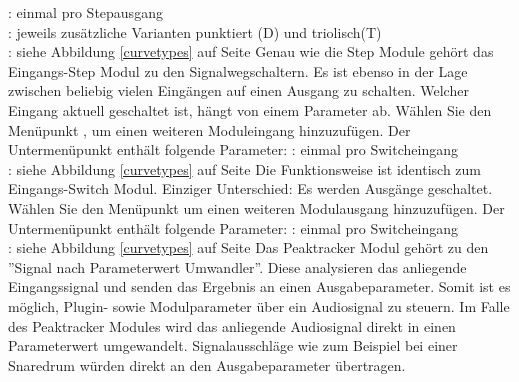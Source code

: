 	\eParameterlist
\stern : einmal pro Stepausgang \\ 
\sstern : jeweils zusätzliche Varianten punktiert (D) und triolisch(T) \\
\ssstern : siehe Abbildung \ref{curvetypes} auf Seite \pageref{curvetypes}
Genau wie die Step Module gehört das Eingangs-Step Modul zu den Signalwegschaltern. Es ist ebenso in der Lage zwischen beliebig vielen Eingängen auf einen Ausgang zu schalten. Welcher Eingang aktuell geschaltet ist, hängt von einem Parameter ab.
	Wählen Sie den Menüpunkt , um einen weiteren Moduleingang hinzuzufügen.
	Der Untermenüpunkt  enthält folgende Parameter:
	\bParameterlist
	\eParameterlist
\stern : einmal pro Switcheingang \\
\sstern : siehe Abbildung \ref{curvetypes} auf Seite \pageref{curvetypes}
Die Funktionsweise ist identisch zum Eingangs-Switch Modul. Einziger Unterschied: Es werden Ausgänge geschaltet. 
	Wählen Sie den Menüpunkt  um einen weiteren Modulausgang hinzuzufügen.
	Der Untermenüpunkt  enthält folgende Parameter:
	\bParameterlist
	\eParameterlist
\stern : einmal pro Switcheingang \\
\sstern : siehe Abbildung \ref{curvetypes} auf Seite \pageref{curvetypes}
Das Peaktracker Modul gehört zu den ''Signal nach Parameterwert Umwandler''. Diese analysieren das anliegende Eingangssignal und senden das Ergebnis an einen Ausgabeparameter. Somit ist es möglich, Plugin- sowie Modulparameter über ein Audiosignal zu steuern. Im Falle des Peaktracker Modules wird das anliegende Audiosignal direkt in einen Parameterwert umgewandelt. Signalausschläge wie zum Beispiel bei einer Snaredrum würden direkt an den Ausgabeparameter übertragen.

